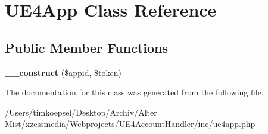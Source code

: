 \hypertarget{class_u_e4_app}{\section{U\-E4\-App Class Reference}
\label{class_u_e4_app}
}
\subsection*{Public Member Functions}
\begin{DoxyCompactItemize}
\item 
\hypertarget{class_u_e4_app_abd50d4753ab8ad6e202cbf264c0afcdc}{{\bfseries \-\_\-\-\_\-construct} (\$appid, \$token)}\label{class_u_e4_app_abd50d4753ab8ad6e202cbf264c0afcdc}

\end{DoxyCompactItemize}


The documentation for this class was generated from the following file\-:\begin{DoxyCompactItemize}
\item 
/\-Users/timkoepsel/\-Desktop/\-Archiv/\-Alter Mist/xzessmedia/\-Webprojects/\-U\-E4\-Account\-Handler/inc/ue4app.\-php\end{DoxyCompactItemize}
